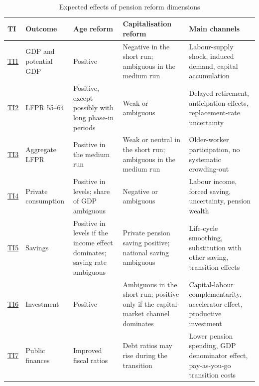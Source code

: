 \documentclass[11pt,english,a4paper, twoside, authoryear]{article}
\begin{document}
\begin{table}[H]
\centering
\begin{singlespace}
\caption{\normalsize Expected effects of pension reform dimensions} \label{tab:expected_effects} \\[-0.3cm]
\scriptsize
\setlength{\tabcolsep}{4pt}
\renewcommand{\arraystretch}{1.25}
\begin{tabularx}{\textwidth}{p{1.1cm}p{3.2cm}p{2.7cm}p{3.2cm}X}
\toprule
TI & Outcome & Age reform & Capitalisation reform & Main channels \\
\midrule

\hyperref[test:gdp]{TI1} 
& GDP and potential GDP
& Positive
& Negative in the short run; ambiguous in the medium run
& Labour-supply shock, induced demand, capital accumulation \\

\hyperref[test:emp_old]{TI2} 
& LFPR 55--64
& Positive, except possibly with long phase-in periods
& Weak or ambiguous
& Delayed retirement, anticipation effects, replacement-rate uncertainty \\

\hyperref[test:emp_agg]{TI3} 
& Aggregate LFPR
& Positive in the medium run
& Weak or neutral in the short run; ambiguous in the medium run
& Older-worker participation, no systematic crowding-out \\

\hyperref[test:conso]{TI4} 
& Private consumption
& Positive in levels; share of GDP ambiguous
& Negative or ambiguous
& Labour income, forced saving, uncertainty, pension wealth \\

\hyperref[test:sav]{TI5} 
& Savings
& Positive in levels if the income effect dominates; saving rate ambiguous
& Private pension saving positive; national saving ambiguous
& Life-cycle smoothing, substitution with other saving, transition effects \\

\hyperref[test:inv]{TI6} 
& Investment
& Positive
& Ambiguous in the short run; positive only if the capital-market channel dominates
& Capital-labour complementarity, accelerator effect, productive investment \\

\hyperref[test:public_finances]{TI7} 
& Public finances
& Improved fiscal ratios
& Debt ratios may rise during the transition
& Lower pension spending, GDP denominator effect, pay-as-you-go transition costs \\


\end{tabularx}
\end{singlespace}
\end{table}
\end{document}
